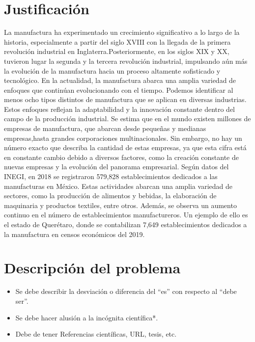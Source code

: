     \section{Justificación}
    La manufactura ha experimentado un crecimiento significativo a lo largo de la historia, especialmente a partir del siglo XVIII con la llegada de la primera revolución industrial en Inglaterra.Posteriormente, en los siglos XIX y XX, tuvieron lugar la segunda y la tercera revolución industrial, impulsando aún más la evolución de la manufactura hacia un proceso altamente sofisticado y tecnológico. En la actualidad, la manufactura abarca una amplia variedad de enfoques que continúan evolucionando con el tiempo. Podemos identificar al menos ocho tipos distintos de manufactura que se aplican en diversas industrias. Estos enfoques reflejan la adaptabilidad y la innovación constante dentro del campo de la producción industrial. \cite{Revoluciónindustrial}
    Se estima que en el mundo existen millones de empresas de manufactura, que abarcan desde pequeñas y medianas empresas,hasta grandes corporaciones multinacionales. Sin embargo, no hay un número exacto que describa la cantidad de estas empresas, ya que esta cifra está en constante cambio debido a diversos factores, como la creación constante de nuevas empresas y la evolución del panorama empresarial.
    Según datos del INEGI, en 2018 se registraron 579,828 establecimientos dedicados a las manufacturas en México. Estas actividades abarcan una amplia variedad de sectores, como la producción de alimentos y bebidas, la elaboración de maquinaria y productos textiles, entre otros. \cite{Cuéntamedemexico}
    Además, se observa un aumento continuo en el número de establecimientos manufactureros. Un ejemplo de ello es el estado de Querétaro, donde se contabilizan 7,649 establecimientos dedicados a la manufactura en censos económicos del 2019.
    \section{Descripción del problema}
    \begin{itemize}
        \item Se debe describir la desviación o diferencia del ``es'' con respecto al ``debe ser''.
        \item Se debe hacer alusión a la incógnita científica*.
        \item Debe de tener Referencias científicas, URL, tesis, etc.
    \end{itemize}
    
